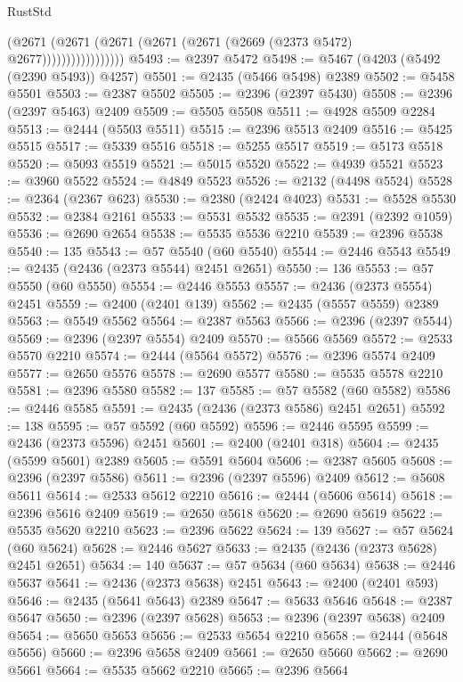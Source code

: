 \begin{lexlean}{RustStd}
\begin{coremodule}
                          (@2671
                            (@2671 (@2671 (@2671 (@2671 (@2669 (@2373 @5472) @2677)))))))))))))))))
@5493 := @2397 @5472
@5498 := @5467 (@4203 (@5492 (@2390 @5493)) @4257)
@5501 := @2435 (@5466 @5498) @2389
@5502 := @5458 @5501
@5503 := @2387 @5502
@5505 := @2396 (@2397 @5430)
@5508 := @2396 (@2397 @5463) @2409
@5509 := @5505 @5508
@5511 := @4928 @5509 @2284
@5513 := @2444 (@5503 @5511)
@5515 := @2396 @5513 @2409
@5516 := @5425 @5515
@5517 := @5339 @5516
@5518 := @5255 @5517
@5519 := @5173 @5518
@5520 := @5093 @5519
@5521 := @5015 @5520
@5522 := @4939 @5521
@5523 := @3960 @5522
@5524 := @4849 @5523
@5526 := @2132 (@4498 @5524)
@5528 := @2364 (@2367 @623)
@5530 := @2380 (@2424 @4023)
@5531 := @5528 @5530
@5532 := @2384 @2161
@5533 := @5531 @5532
@5535 := @2391 (@2392 @1059)
@5536 := @2690 @2654
@5538 := @5535 @5536 @2210
@5539 := @2396 @5538
@5540 := 135
@5543 := @57 @5540 (@60 @5540)
@5544 := @2446 @5543
@5549 := @2435 (@2436 (@2373 @5544) @2451 @2651)
@5550 := 136
@5553 := @57 @5550 (@60 @5550)
@5554 := @2446 @5553
@5557 := @2436 (@2373 @5554) @2451
@5559 := @2400 (@2401 @139)
@5562 := @2435 (@5557 @5559) @2389
@5563 := @5549 @5562
@5564 := @2387 @5563
@5566 := @2396 (@2397 @5544)
@5569 := @2396 (@2397 @5554) @2409
@5570 := @5566 @5569
@5572 := @2533 @5570 @2210
@5574 := @2444 (@5564 @5572)
@5576 := @2396 @5574 @2409
@5577 := @2650 @5576
@5578 := @2690 @5577
@5580 := @5535 @5578 @2210
@5581 := @2396 @5580
@5582 := 137
@5585 := @57 @5582 (@60 @5582)
@5586 := @2446 @5585
@5591 := @2435 (@2436 (@2373 @5586) @2451 @2651)
@5592 := 138
@5595 := @57 @5592 (@60 @5592)
@5596 := @2446 @5595
@5599 := @2436 (@2373 @5596) @2451
@5601 := @2400 (@2401 @318)
@5604 := @2435 (@5599 @5601) @2389
@5605 := @5591 @5604
@5606 := @2387 @5605
@5608 := @2396 (@2397 @5586)
@5611 := @2396 (@2397 @5596) @2409
@5612 := @5608 @5611
@5614 := @2533 @5612 @2210
@5616 := @2444 (@5606 @5614)
@5618 := @2396 @5616 @2409
@5619 := @2650 @5618
@5620 := @2690 @5619
@5622 := @5535 @5620 @2210
@5623 := @2396 @5622
@5624 := 139
@5627 := @57 @5624 (@60 @5624)
@5628 := @2446 @5627
@5633 := @2435 (@2436 (@2373 @5628) @2451 @2651)
@5634 := 140
@5637 := @57 @5634 (@60 @5634)
@5638 := @2446 @5637
@5641 := @2436 (@2373 @5638) @2451
@5643 := @2400 (@2401 @593)
@5646 := @2435 (@5641 @5643) @2389
@5647 := @5633 @5646
@5648 := @2387 @5647
@5650 := @2396 (@2397 @5628)
@5653 := @2396 (@2397 @5638) @2409
@5654 := @5650 @5653
@5656 := @2533 @5654 @2210
@5658 := @2444 (@5648 @5656)
@5660 := @2396 @5658 @2409
@5661 := @2650 @5660
@5662 := @2690 @5661
@5664 := @5535 @5662 @2210
@5665 := @2396 @5664

\end{coremodule}
\end{lexlean}
